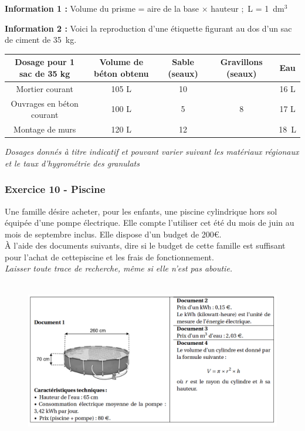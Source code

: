\documentclass[11pt]{article}
\begin{document}
\textbf{Information 1 :} Volume du prisme = aire de la base $\times$ hauteur ;~L = 1~dm$^3$

\textbf{Information 2 :} Voici la reproduction d'une étiquette figurant au dos d'un sac de ciment
de 35~kg.

\begin{center}
  \begin{tabular}{|c|c|c|c|c|}  \hline
    Dosage pour 1 sac de 35 kg	&Volume de béton obtenu	&Sable (seaux)	&Gravillons (seaux)	&Eau\\ \hline
    Mortier courant 			&105 L					&10				&					&16 L\\ \hline
    Ouvrages en béton courant	&100 L					&5				&8 					&17 L\\ \hline
    Montage de murs 			&120 L 					&12				&					&18~L\\ \hline
  \end{tabular}
\end{center}
\textit{Dosages donnés à titre indicatif et pouvant varier suivant les matériaux régionaux et le taux d'hygrométrie des granulats}

\subsubsection*{Exercice 10 - Piscine}

Une famille désire acheter, pour les enfants, une piscine cylindrique hors sol équipée d’une pompe électrique. Elle compte l’utiliser cet été du mois de juin au mois de septembre inclus. Elle dispose d’un budget de 200\euro. \\
À l’aide des documents suivants, dire si le budget de cette famille est suffisant pour l’achat de cettepiscine et les frais de fonctionnement. \\
\textit{Laisser toute trace de recherche, même si elle n’est pas aboutie.}

\begin{figure}[H]
      \centering
      \includegraphics[width=0.8\linewidth]{3x3-volumes-1/sources/piscine.png}
\end{figure}
\end{document}
